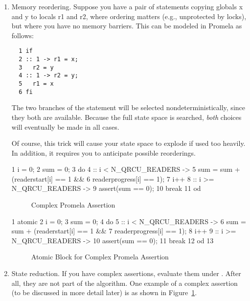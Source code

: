 \begin{enumerate}
\item	Memory reordering.  Suppose you have a pair of statements
	copying globals x and y to locals r1 and r2, where ordering
	matters (e.g., unprotected by locks), but where you have
	no memory barriers.  This can be modeled in Promela as follows:

\vspace{5pt}
\begin{minipage}[t]{\columnwidth}
\scriptsize
\begin{verbatim}
  1 if
  2 :: 1 -> r1 = x;
  3   r2 = y
  4 :: 1 -> r2 = y;
  5   r1 = x
  6 fi
\end{verbatim}
\end{minipage}
\vspace{5pt}

	The two branches of the  statement will be selected
	nondeterministically, since they both are available.
	Because the full state space is searched, \emph{both} choices
	will eventually be made in all cases.

	Of course, this trick will cause your state space to explode
	if used too heavily.
	In addition, it requires you to anticipate possible reorderings.

{ \scriptsize
\begin{verbbox}
  1 i = 0;
  2 sum = 0;
  3 do
  4 :: i < N_QRCU_READERS ->
  5   sum = sum + (readerstart[i] == 1 &&
  6     readerprogress[i] == 1);
  7   i++
  8 :: i >= N_QRCU_READERS ->
  9   assert(sum == 0);
 10   break
 11 od
\end{verbbox}
}
\begin{figure}[tbp]
\centering
\theverbbox
\caption{Complex Promela Assertion}
\label{fig:analysis:Complex Promela Assertion}
\end{figure}

{ \scriptsize
\begin{verbbox}
  1 atomic {
  2   i = 0;
  3   sum = 0;
  4   do
  5   :: i < N_QRCU_READERS ->
  6     sum = sum + (readerstart[i] == 1 &&
  7       readerprogress[i] == 1);
  8     i++
  9   :: i >= N_QRCU_READERS ->
 10     assert(sum == 0);
 11     break
 12   od
 13 }
\end{verbbox}
}
\begin{figure}[tbp]
\centering
\theverbbox
\caption{Atomic Block for Complex Promela Assertion}
\label{fig:analysis:Atomic Block for Complex Promela Assertion}
\end{figure}

\item	State reduction.  If you have complex assertions, evaluate
	them under .  After all, they are not part of the
	algorithm.  One example of a complex assertion (to be discussed
	in more detail later) is as shown in
	Figure~\ref{fig:analysis:Complex Promela Assertion}.


\end{enumerate}

